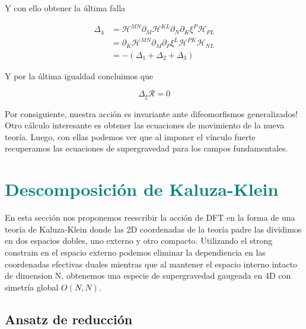 \documentclass{article}
\numberwithin{equation}{section}
\begin{document}
Y con ello obtener la última falla

\begin{equation}\label{key}
\begin{aligned}
\Delta_4 &= \mathcal{H}^{MN}\partial_M \mathcal{H}^{KL}\partial_N\partial_K \xi^P\mathcal{H}_{PL}\\
&= \partial_K \mathcal{H}^{MN}\partial_M\partial_P \xi^L \mathcal{H}^{PK}\mathcal{H}_{NL}\\
&= - \left( \Delta_1 + \Delta_2 + \Delta_3\right)
\end{aligned}
\end{equation}

Y por la última igualdad concluimos que 

\begin{boxquation}
\begin{equation}\label{key}
\Delta_{\xi} \mathcal{R} = 0
\end{equation}
\end{boxquation}

Por consiguiente, nuestra acción es invariante ante difeomorfismos generalizados!\\

Otro cálculo interesante es obtener las ecuaciones de movimiento de la nueva teoría. Luego, con ellas podemos ver que al imponer el vínculo fuerte recuperamos las ecuaciones de supergravedad para los campos fundamentales.



\section{\textcolor{teal}{Descomposición de Kaluza-Klein}}\label{sec_DFTKK}

En esta sección nos proponemos reescribir la acción de DFT en la forma de una teoría de Kaluza-Klein donde las 2D coordenadas de la teoría padre las dividimos en dos espacios dobles, uno externo y otro compacto. Utilizando el strong constrain en el espacio externo podemos eliminar la dependiencia en las coordenadas efectivas duales mientras que al mantener el espacio interno intacto de dimension N, obtenemos una especie de supergravedad gaugeada en 4D con simetría global $ O(N,N) $.

\subsection{\textcolor{teal!60!white}{Ansatz de reducción}}\label{sec_ansatz}
\end{document}
